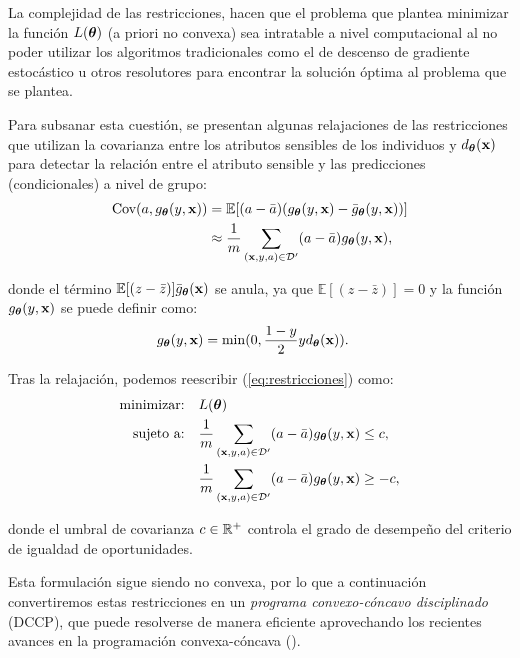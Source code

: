 \documentclass[oneside,openright,titlepage,numbers=noenddot,openany,headinclude,footinclude=true,
cleardoublepage=empty,abstractoff,BCOR=5mm,paper=a4,fontsize=12pt,main=spanish]{scrreprt}
\begin{document}
La complejidad de las restricciones, hacen que el problema que plantea minimizar la función $L(\bm{\theta})$ (a priori no convexa) sea intratable a nivel computacional al no poder utilizar los algoritmos tradicionales como el de descenso de gradiente estocástico u otros resolutores para encontrar la solución óptima al problema que se plantea. 

Para subsanar esta cuestión, se presentan algunas relajaciones de las restricciones que utilizan la covarianza entre los atributos sensibles de los individuos y $d_{\bm{\theta}}(\textbf{x})$ para detectar la relación entre el atributo sensible y las predicciones (condicionales) a nivel de grupo:
\begin{equation*}
\begin{split}
\text{Cov}(a,g_{\bm{\theta}}(y,\textbf{x}))&=\mathbb{E}[(a-\bar{a})(g_{\bm{\theta}}(y,\textbf{x})-\bar{g}_{\bm{\theta}}(y,\textbf{x}))]\\
&\approx \frac{1}{m} \sum_{(\textbf{x},y,a)\in \mathcal{D}'}(a-\bar{a})g_{\bm{\theta}}(y,\textbf{x}),
\end{split}
\end{equation*}

donde el término $\mathbb{E}[(z-\bar{z})]\bar{g}_{\bm{\theta}}(\textbf{x})$ se anula, ya que $\mathbb{E}[(z-\bar{z})]=0$ y la función $g_{\bm{\theta}}(y,\textbf{x})$ se puede definir como:
\begin{equation*}
\begin{split}
g_{\bm{\theta}}(y,\textbf{x})&=\min (0,\frac{1-y}{2} y d_{\bm{\theta}} (\textbf{x})).
\end{split}
\end{equation*}

Tras la relajación, podemos reescribir (\ref{eq:restricciones}) como:
\begin{equation}\label{eq:restricciones2}
\begin{split}
\text{minimizar:} &\quad L(\bm{\theta})\\
\text{sujeto a:} &\quad \frac{1}{m} \sum_{(\textbf{x},y,a)\in \mathcal D'} (a-\bar{a})g_{\bm{\theta}}(y,\textbf{x}) \leq c,\\
&\quad \frac{1}{m} \sum_{(\textbf{x},y,a)\in \mathcal D'} (a-\bar{a})g_{\bm{\theta}}(y,\textbf{x})  \geq -c,
\end{split}
\end{equation}

donde el umbral de covarianza $c \in \mathbb{R}^+$ controla el grado de desempeño del criterio de igualdad de oportunidades.

Esta formulación sigue siendo no convexa, por lo que a continuación convertiremos estas restricciones en un \textit{programa convexo-cóncavo disciplinado} (DCCP), que puede resolverse de manera eficiente aprovechando los recientes avances en la programación convexa-cóncava (\cite{convex2016}).
\end{document}
